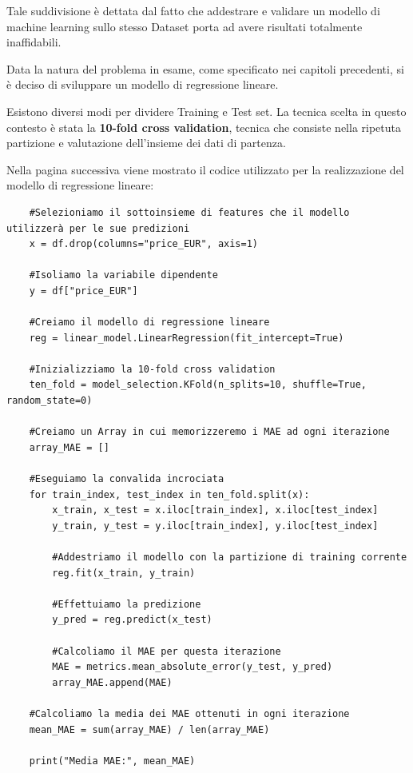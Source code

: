 Tale suddivisione è dettata dal fatto che addestrare e validare un modello di machine learning sullo stesso Dataset porta ad avere risultati totalmente inaffidabili.

Data la natura del problema in esame, come specificato nei capitoli precedenti, si è deciso di sviluppare un modello di regressione lineare. 

Esistono diversi modi per dividere Training e Test set. La tecnica scelta in questo contesto è stata la \textbf{10-fold cross validation}, tecnica che consiste nella ripetuta partizione e valutazione dell'insieme dei dati di partenza.

Nella pagina successiva viene mostrato il codice utilizzato per la realizzazione del modello di regressione lineare:
\pagebreak
    \begin{lstlisting}
    #Selezioniamo il sottoinsieme di features che il modello utilizzerà per le sue predizioni
    x = df.drop(columns="price_EUR", axis=1)

    #Isoliamo la variabile dipendente
    y = df["price_EUR"]

    #Creiamo il modello di regressione lineare
    reg = linear_model.LinearRegression(fit_intercept=True)

    #Inizializziamo la 10-fold cross validation
    ten_fold = model_selection.KFold(n_splits=10, shuffle=True, random_state=0)

    #Creiamo un Array in cui memorizzeremo i MAE ad ogni iterazione
    array_MAE = []

    #Eseguiamo la convalida incrociata
    for train_index, test_index in ten_fold.split(x):
        x_train, x_test = x.iloc[train_index], x.iloc[test_index]
        y_train, y_test = y.iloc[train_index], y.iloc[test_index]

        #Addestriamo il modello con la partizione di training corrente
        reg.fit(x_train, y_train)

        #Effettuiamo la predizione
        y_pred = reg.predict(x_test)

        #Calcoliamo il MAE per questa iterazione
        MAE = metrics.mean_absolute_error(y_test, y_pred)
        array_MAE.append(MAE)

    #Calcoliamo la media dei MAE ottenuti in ogni iterazione
    mean_MAE = sum(array_MAE) / len(array_MAE)

    print("Media MAE:", mean_MAE)
    \end{lstlisting}
    \medskip
    
